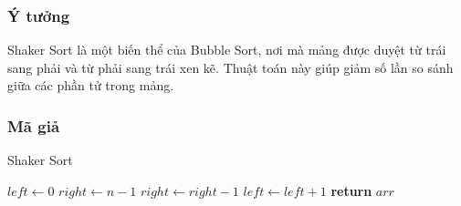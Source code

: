 \subsubsection{Ý tưởng}

Shaker Sort là một biến thể của Bubble Sort, nơi mà mảng được duyệt từ trái sang phải và từ phải sang trái xen kẽ. Thuật toán này giúp giảm số lần so sánh giữa các phần tử trong mảng.

\subsubsection{Mã giả}

\begin{algorithm}[H]
\caption{Shaker Sort}
\begin{algorithmic}[1]
    \State $left \gets 0$
    \State $right \gets n - 1$
                \State {}
            \EndIf
        \EndFor
        \State $right \gets right - 1$
                \State {}
            \EndIf
        \EndFor
        \State $left \gets left + 1$
    \EndWhile
    \State \textbf{return} $arr$
\EndFunction
\end{algorithmic}
\end{algorithm}

